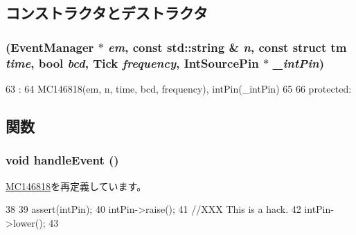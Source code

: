 \subsection{コンストラクタとデストラクタ}
\hypertarget{classX86ISA_1_1Cmos_1_1X86RTC_ad1453b48e64ab00d27a425cdfa58918e}{
\subsubsection[{X86RTC}]{ ({\bf EventManager} $\ast$ {\em em}, \/  const std::string \& {\em n}, \/  const struct tm {\em time}, \/  bool {\em bcd}, \/  {\bf Tick} {\em frequency}, \/  {\bf IntSourcePin} $\ast$ {\em \_\-intPin})}}
\label{classX86ISA_1_1Cmos_1_1X86RTC_ad1453b48e64ab00d27a425cdfa58918e}



\begin{DoxyCode}
63                                                                   :
64             MC146818(em, n, time, bcd, frequency), intPin(_intPin)
65         {
66         }
      protected:
\end{DoxyCode}


\subsection{関数}
\hypertarget{classX86ISA_1_1Cmos_1_1X86RTC_af592dd6aaf1c9c6af780a5cbc531417e}{
\subsubsection[{handleEvent}]{\setlength{\rightskip}{0pt plus 5cm}void handleEvent ()}}
\label{classX86ISA_1_1Cmos_1_1X86RTC_af592dd6aaf1c9c6af780a5cbc531417e}


\hyperlink{classMC146818_a30dfd044b822d58a6ff7335f815af8b1}{MC146818}を再定義しています。


\begin{DoxyCode}
38 {
39     assert(intPin);
40     intPin->raise();
41     //XXX This is a hack.
42     intPin->lower();
43 }
\end{DoxyCode}


